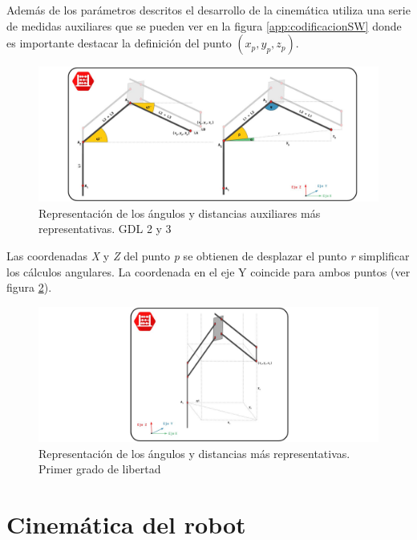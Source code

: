     Además de los parámetros descritos el desarrollo de la cinemática utiliza una serie de medidas auxiliares que se pueden ver en la figura \ref{app:codificacionSW} donde es importante destacar la definición del punto $(x_p,y_p,z_p)$.

    \begin{figure}[H]
    	\centering
    	\includegraphics[width=1\textwidth]{figuras/Imagenes_cinematica/cinematica_1.jpg}
    	\caption{Representación de los ángulos y distancias auxiliares más representativas. GDL 2 y 3}
    	\label{fig:Control:cinematica_1}
    \end{figure}
    
    Las coordenadas \textit{X} y \textit{Z} del punto \textit{p} se obtienen de desplazar el punto \textit{r} simplificar los cálculos angulares. La coordenada en el eje Y coincide para ambos puntos (ver figura \ref{fig:Control:cinematica_2}).
    \begin{figure}[H]
    	\centering
    	\includegraphics[width=1\textwidth]{figuras/Imagenes_cinematica/cinematica_2.jpg}
    	\caption{Representación de los ángulos y distancias más representativas. Primer grado de libertad}
    	\label{fig:Control:cinematica_2}
    \end{figure}
\section{Cinemática del robot}


